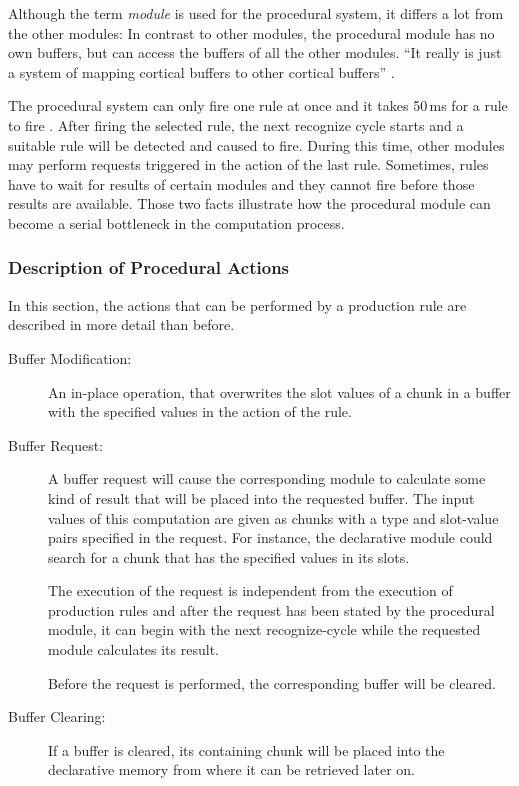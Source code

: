 Although the term \emph{module} is used for the procedural system, it differs a lot from the other modules: In contrast to other modules, the procedural module has no own buffers, but can access the buffers of all the other modules. ``It really is just a system of mapping cortical buffers to other cortical buffers'' \cite[p. 54]{anderson_how_2007}.

The procedural system can only fire one rule at once and it takes 50\,ms for a rule to fire \cite[p. 54]{anderson_how_2007}. After firing the selected rule, the next recognize cycle starts and a suitable rule will be detected and caused to fire. During this time, other modules may perform requests triggered in the action of the last rule. Sometimes, rules have to wait for results of certain modules and they cannot fire before those results are available. Those two facts illustrate how the procedural module can become a serial bottleneck in the computation process.

\subsubsection{Description of Procedural Actions}
\label{description_of_proc_actions}

In this section, the actions that can be performed by a production rule are described in more detail than before.

\begin{description}
 \item[Buffer Modification:] 
 
 An in-place operation, that overwrites the slot values of a chunk in a buffer with the specified values in the action of the rule.
 
 \item[Buffer Request:] 
 
 A buffer request will cause the corresponding module to calculate some kind of result that will be placed into the requested buffer. The input values of this computation are given as chunks with a type and slot-value pairs specified in the request. For instance, the declarative module could search for a chunk that has the specified values in its slots.
 
 The execution of the request is independent from the execution of production rules and after the request has been stated by the procedural module, it can begin with the next recognize-cycle while the requested module calculates its result.
 
 Before the request is performed, the corresponding buffer will be cleared.
 
 \item[Buffer Clearing:] 
 
 If a buffer is cleared, its containing chunk will be placed into the declarative memory from where it can be retrieved later on.
\end{description}

